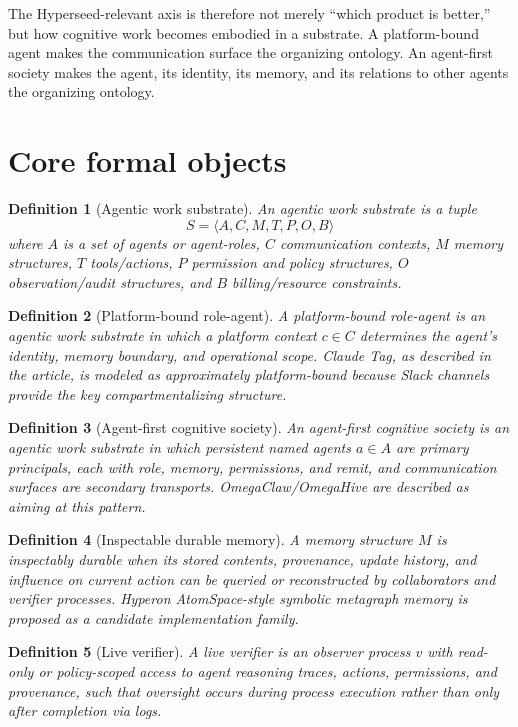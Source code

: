 \documentclass[11pt,a4paper]{article}
\newtheorem{definition}{Definition}[section]
\begin{document}
The Hyperseed-relevant axis is therefore not merely ``which product is better,'' but how cognitive work becomes embodied in a substrate. A platform-bound agent makes the communication surface the organizing ontology. An agent-first society makes the agent, its identity, its memory, and its relations to other agents the organizing ontology.

\section{Core formal objects}

\begin{definition}[Agentic work substrate]
An agentic work substrate is a tuple
\[
S = \langle A, C, M, T, P, O, B \rangle
\]
where $A$ is a set of agents or agent-roles, $C$ communication contexts, $M$ memory structures, $T$ tools/actions, $P$ permission and policy structures, $O$ observation/audit structures, and $B$ billing/resource constraints.
\end{definition}

\begin{definition}[Platform-bound role-agent]
A platform-bound role-agent is an agentic work substrate in which a platform context $c \in C$ determines the agent's identity, memory boundary, and operational scope. Claude Tag, as described in the article, is modeled as approximately platform-bound because Slack channels provide the key compartmentalizing structure.
\end{definition}

\begin{definition}[Agent-first cognitive society]
An agent-first cognitive society is an agentic work substrate in which persistent named agents $a \in A$ are primary principals, each with role, memory, permissions, and remit, and communication surfaces are secondary transports. OmegaClaw/OmegaHive are described as aiming at this pattern.
\end{definition}

\begin{definition}[Inspectable durable memory]
A memory structure $M$ is inspectably durable when its stored contents, provenance, update history, and influence on current action can be queried or reconstructed by collaborators and verifier processes. Hyperon AtomSpace-style symbolic metagraph memory is proposed as a candidate implementation family.
\end{definition}

\begin{definition}[Live verifier]
A live verifier is an observer process $v$ with read-only or policy-scoped access to agent reasoning traces, actions, permissions, and provenance, such that oversight occurs during process execution rather than only after completion via logs.
\end{definition}
\end{document}
